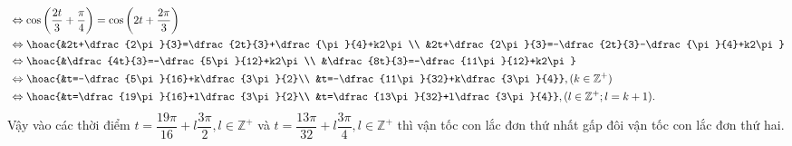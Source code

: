 \begin{ex}
{\begin{enumerate}
\begin{align*}
				 &\Leftrightarrow \cos\left(\dfrac{2t}{3}+\dfrac{\pi}{4}\right) =\cos\left(2t+\dfrac{2\pi}{3}\right)\\
				&\Leftrightarrow \hoac{&2t+\dfrac{2\pi}{3}=\dfrac{2t}{3}+\dfrac{\pi}{4}+k2\pi\\  &2t+\dfrac{2\pi}{3}=-\dfrac{2t}{3}-\dfrac{\pi}{4}+k2\pi}\\
				&\Leftrightarrow  \hoac{&\dfrac{4t}{3}=-\dfrac{5\pi}{12}+k2\pi\\ &\dfrac{8t}{3}=-\dfrac{11\pi}{12}+k2\pi}\\
				&\Leftrightarrow \hoac{&t=-\dfrac{5\pi}{16}+k\dfrac{3\pi}{2}\\ &t=-\dfrac{11\pi}{32}+k\dfrac{3\pi}{4}},  (k\in\mathbb{Z}^+)\\
				&\Leftrightarrow \hoac{&t=\dfrac{19\pi}{16}+l\dfrac{3\pi}{2}\\ &t=\dfrac{13\pi}{32}+l\dfrac{3\pi}{4}},  (l\in\mathbb{Z}^+; l=k+1).
			\end{align*}
			Vậy vào các thời điểm $t=\dfrac{19\pi}{16}+l\dfrac{3\pi}{2},  l\in \mathbb{Z}^+$ và $t=\dfrac{13\pi}{32}+l\dfrac{3\pi}{4}, l\in \mathbb{Z}^+$ thì vận tốc con lắc đơn thứ nhất gấp đôi vận tốc con lắc đơn thứ hai.
		\end{enumerate}
	 }
\end{ex}

